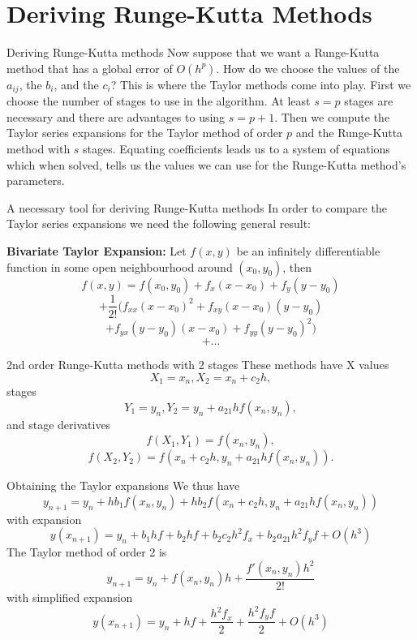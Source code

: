 \documentclass[12pt]{beamer}
\begin{document}
\section[Deriving Runge-Kutta]{Deriving Runge-Kutta Methods}
\begin{frame}{Deriving Runge-Kutta methods}
  Now suppose that we want a Runge-Kutta method that has a global error of $O(h^p)$.
  How do we choose the values of the $a_{ij}$, the $b_i$, and the $c_i$? \newline
  \newline
  \pause
  This is where the Taylor methods come into play. \newline
  \newline
  \pause
  First we choose the number of stages to use in the algorithm. At least $s = p$ stages
  are necessary and there are advantages to using $s = p + 1$. \newline
  \newline
  \pause
  Then we compute the Taylor series expansions for the Taylor method of order $p$ and
  the Runge-Kutta method with $s$ stages. Equating coefficients leads us to a system of
  equations which when solved, tells us the values we can use for the Runge-Kutta method's
  parameters.
\end{frame}

\begin{frame}{A necessary tool for deriving Runge-Kutta methods}
  In order to compare the Taylor series expansions we need the following general result:
  \begin{theorem}{\textbf{Bivariate Taylor Expansion:}}
    Let $f(x,y)$ be an infinitely differentiable function in some open neighbourhood around
    $(x_0,y_0)$, then
    $$f(x,y) = f(x_0,y_0) + f_x(x-x_0) + f_y(y-y_0) $$
    \pause
    $$+\frac{1}{2!}(f_{xx}(x-x_0)^2 + f_{xy}(x-x_0)(y-y_0)$$
    $$+ f_{yx}(y-y_0)(x-x_0) + f_{yy}(y-y_0)^2)$$
    $$+ \dots$$
  \end{theorem}
\end{frame}

\begin{frame}{2nd order Runge-Kutta methods with 2 stages}
  These methods have X values
  $$X_1 = x_n, X_2 = x_n + c_2h,$$
  \pause
  stages
  $$Y_1 = y_n, Y_2 = y_n + a_{21}hf(x_n,y_n),$$
  \pause
  and stage derivatives
  $$f(X_1,Y_1) = f(x_n,y_n),$$ 
  $$f(X_2,Y_2) = f(x_n + c_2h, y_n + a_{21}hf(x_n,y_n)).$$
\end{frame}

\begin{frame}{Obtaining the Taylor expansions}
  We thus have
  $$y_{n+1} = y_n + hb_1f(x_n,y_n) + hb_2f(x_n + c_2h,y_n + a_{21}hf(x_n,y_n))$$
  \pause
  with expansion
  $$y(x_{n+1}) = y_n + b_1hf + b_2hf + b_2c_2h^2f_x + b_2a_{21}h^2f_yf + O(h^3)$$
  \pause
  The Taylor method of order 2 is 
  $$y_{n+1} = y_n + f(x_n,y_n)h + \frac{f'(x_n,y_n)h^2}{2!}$$
  \pause
  with simplified expansion
  $$y(x_{n+1}) = y_n + hf + \frac{h^2f_x}{2} + \frac{h^2f_yf}{2} + O(h^3)$$
\end{frame}
\end{document}
